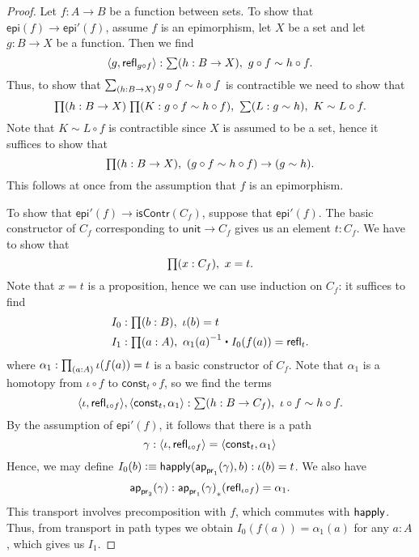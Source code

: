 \begin{proof}
Let $f:A\to B$ be a function between sets.
To show that $\mathsf{epi}(f)\to\mathsf{epi}'(f)$, assume $f$ is an epimorphism,
let $X$ be a set and let $g:B\to X$ be a function. Then we find
\begin{equation*}
\pairr{g,\refl{g\circ f}}:\sm{h:B\to X} g\circ f\sim h\circ f.
\end{equation*}
Thus, to show that $\sm{h:B\to X} g\circ f\sim h\circ f$ 
is contractible we need to show that
\begin{equation*}
\prd{h:B\to X}{K:g\circ f\sim h\circ f}\sm{L:g\sim h} K\sim L\circ f.
\end{equation*}
Note that $K\sim L\circ f$ is contractible since $X$ is assumed to be a set,
hence it suffices to show that
\begin{equation*}
\prd{h:B\to X} (g\circ f\sim h\circ f)\to (g\sim h).
\end{equation*}
This follows at once from the assumption that $f$ is an epimorphism.

To show that $\mathsf{epi}'(f)\to\mathsf{isContr}(C_f)$, suppose that
$\mathsf{epi}'(f)$. The basic constructor of $C_f$ corresponding to
$\mathsf{unit}\to C_f$ gives us an element $t:C_f$. We have to show that
\begin{equation*}
\prd{x:C_f} x= t.
\end{equation*}
Note that $x= t$ is a proposition, hence we can use induction on
$C_f$: it suffices to find
\begin{align*}
I_0 & : \prd{b:B} \iota(b)= t\\
I_1 & : \prd{a:A} \opp{\alpha_1(a)} \ct I_0(f(a))=\refl{t}.
\end{align*}
where $\alpha_1:\prd{a:A} \iota(f(a))= t$ is a basic constructor
of $C_f$. Note that $\alpha_1$ is a homotopy from $\iota\circ f$ to
$\mathsf{const}_t\circ f$, so we find the terms
\begin{equation*}
\pairr{\iota,\refl{\iota\circ f}},\pairr{\mathsf{const}_t,\alpha_1}:
\sm{h:B\to C_f} \iota\circ f\sim h\circ f.
\end{equation*}
By the assumption of $\mathsf{epi}'(f)$, it follows that there is a path
\begin{equation*}
\gamma:{\langle \iota,\mathsf{refl}_{\iota\circ f}\rangle}={\langle \mathsf{const}_t,\alpha_1\rangle}
\end{equation*}
Hence, we may define $I_0(b)\vcentcolon\equiv \mathsf{happly}(\mathsf{ap}_{\mathsf{pr}_{1}}(\gamma),b):\iota(b)=t$.
We also have
\[\mathsf{ap}_{\mathsf{pr}_{2}}(\gamma) : {\mathsf{ap}_{\mathsf{pr}_{1}}(\gamma)}_{*}({\mathsf{refl}_{\iota\circ f}}) = \alpha_1. \]
This transport involves precomposition with $f$, which commutes with $\mathsf{happly}$.
Thus, from transport in path types we obtain $I_0(f(a)) = \alpha_1(a)$ for any $a:A$, which gives us $I_1$.


\end{proof}
